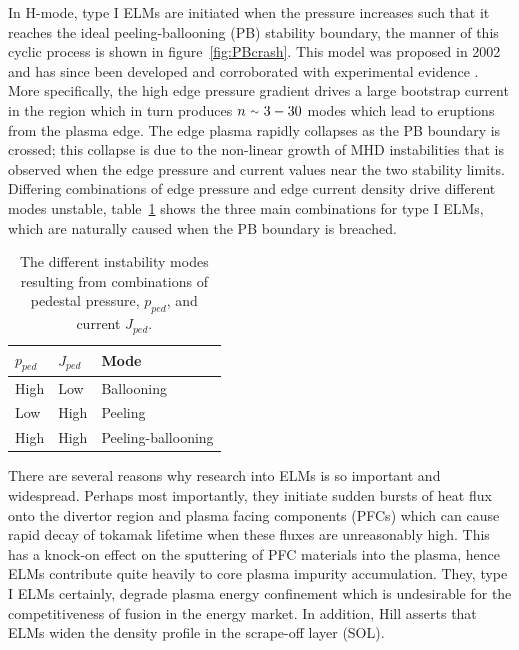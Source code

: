 \documentclass[11pt, twocolumn]{article}  %
\providecommand{\squiggle}{\raise.17ex\hbox{$\scriptstyle\sim$}} %
\begin{document}
In H-mode, type I ELMs are initiated when the pressure increases such that it reaches the ideal peeling-ballooning (PB) stability boundary, the manner of this cyclic process is shown in figure~\ref{fig:PBcrash}. This model was proposed in 2002 \cite{Snyder2002} and has since been developed and corroborated with experimental evidence \cite{Wilson2002}. More specifically, the high edge pressure gradient drives a large bootstrap current in the region which in turn produces $n~\squiggle~3-30$ modes \cite{Snyder2009} which lead to eruptions from the plasma edge. The edge plasma rapidly collapses as the PB boundary is crossed; this collapse is due to the non-linear growth of MHD instabilities \cite{Wilson2004} that is observed when the edge pressure and current values near the two stability limits. Differing combinations of edge pressure and edge current density drive different modes unstable, table~\ref{tab:PB} shows the three main combinations for type I ELMs, which are naturally caused when the PB boundary is breached.

\begin{table}[h]
\centering
\caption{The different instability modes resulting from combinations of pedestal pressure, $p_{ped}$, and current $J_{ped}$.\cite{Lang2013}}
\label{tab:PB}
\begin{tabular}{ l | l | l}
\hline
\textbf{$p_{ped}$}   & \textbf{$J_{ped}$} & \textbf{Mode} \\ \hline
   High      &    Low     &  Ballooning \\ 
   Low       &    High    &  Peeling    \\
   High      &    High    &  Peeling-ballooning
\end{tabular}
\end{table}

There are several reasons why research into ELMs is so important and widespread. Perhaps most importantly, they initiate sudden bursts of heat flux onto the divertor region and plasma facing components (PFCs) which can cause rapid decay of tokamak lifetime when these fluxes are unreasonably high. This has a knock-on effect on the sputtering of PFC materials into the plasma, hence ELMs contribute quite heavily to core plasma impurity accumulation. They, type I ELMs certainly, degrade plasma energy confinement which is undesirable for the competitiveness of fusion in the energy market. In addition, Hill \cite{Hill1997} asserts that ELMs widen the density profile in the scrape-off layer (SOL).
\end{document}
